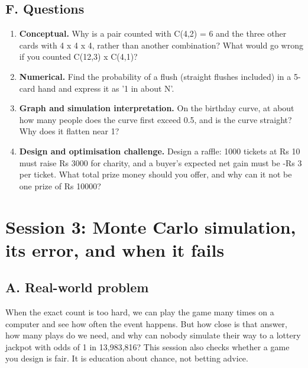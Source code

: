 \documentclass[11pt,a4paper]{article}
\begin{document}
\subsection*{F. Questions}
\begin{enumerate}[nosep]
\item \textbf{Conceptual.} Why is a pair counted with C(4,2) = 6 and the three other cards with 4 x 4 x 4, rather than another combination? What would go wrong if you counted C(12,3) x C(4,1)?
\item \textbf{Numerical.} Find the probability of a flush (straight flushes included) in a 5-card hand and express it as '1 in about N'.
\item \textbf{Graph and simulation interpretation.} On the birthday curve, at about how many people does the curve first exceed 0.5, and is the curve straight? Why does it flatten near 1?
\item \textbf{Design and optimisation challenge.} Design a raffle: 1000 tickets at Rs 10 must raise Rs 3000 for charity, and a buyer's expected net gain must be -Rs 3 per ticket. What total prize money should you offer, and why can it not be one prize of Rs 10000?
\end{enumerate}

\section{Session 3: Monte Carlo simulation, its error, and when it fails}

\subsection*{A. Real-world problem}
When the exact count is too hard, we can play the game many times on a computer and see how often the event happens. But how close is that answer, how many plays do we need, and why can nobody simulate their way to a lottery jackpot with odds of 1 in 13,983,816? This session also checks whether a game you design is fair. It is education about chance, not betting advice.
\end{document}
